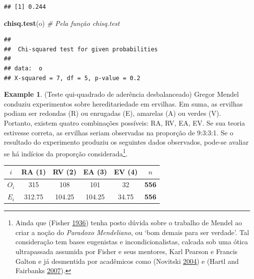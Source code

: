 \documentclass[
]{book}
\newenvironment{Shaded}{\begin{snugshade}}{\end{snugshade}}
\newcommand{\CommentTok}[1]{\textcolor[rgb]{0.56,0.35,0.01}{\textit{#1}}}
\newcommand{\KeywordTok}[1]{\textcolor[rgb]{0.13,0.29,0.53}{\textbf{#1}}}
\newcommand{\NormalTok}[1]{#1}
\theoremstyle{definition}
\theoremstyle{definition}
\newtheorem{example}{Example}[chapter]
\theoremstyle{definition}
\theoremstyle{remark}
\begin{document}
\begin{verbatim}
## [1] 0.244
\end{verbatim}

\begin{Shaded}
\begin{Highlighting}[]
\KeywordTok{chisq.test}\NormalTok{(o)                 }\CommentTok{\# Pela função \textquotesingle{}chisq.test\textquotesingle{}}
\end{Highlighting}
\end{Shaded}

\begin{verbatim}
## 
##  Chi-squared test for given probabilities
## 
## data:  o
## X-squared = 7, df = 5, p-value = 0.2
\end{verbatim}

\begin{example}
\protect\hypertarget{exm:qui-ader2}{}{\label{exm:qui-ader2} }(Teste qui-quadrado de aderência desbalanceado) Gregor Mendel conduziu experimentos sobre hereditariedade em ervilhas. Em suma, as ervilhas podiam ser redondas (R) ou enrugadas (E), amarelas (A) ou verdes (V). Portanto, existem quatro combinações possíveis: RA, RV, EA, EV. Se sua teoria estivesse correta, as ervilhas seriam observadas na proporção de 9:3:3:1. Se o resultado do experimento produziu os seguintes dados observados, pode-se avaliar se há indícios da proporção considerada\footnote{Ainda que (Fisher \protect\hyperlink{ref-fisher1936has}{1936}) tenha posto dúvida sobre o trabalho de Mendel ao criar a noção do \emph{Paradoxo Mendeliano}, ou `bom demais para ser verdade'. Tal consideração tem bases eugenistas e incondicionalistas, calcada sob uma ótica ultrapassada assumida por Fisher e seus mentores, Karl Pearson e Francis Galton e já desmentida por acadêmicos como (Novitski \protect\hyperlink{ref-novitski2004fisher}{2004}) e (Hartl and Fairbanks \protect\hyperlink{ref-hartl2007mud}{2007}).}.

\begin{longtable}[]{@{}cccccc@{}}
\toprule
\(i\) & RA (1) & RV (2) & EA (3) & EV (4) & \textbf{\(n\)}\tabularnewline
\midrule
\endhead
\(O_i\) & 315 & 108 & 101 & 32 & \textbf{556}\tabularnewline
\(E_i\) & 312.75 & 104.25 & 104.25 & 34.75 & \textbf{556}\tabularnewline
\bottomrule
\end{longtable}


\end{example}
\end{document}
